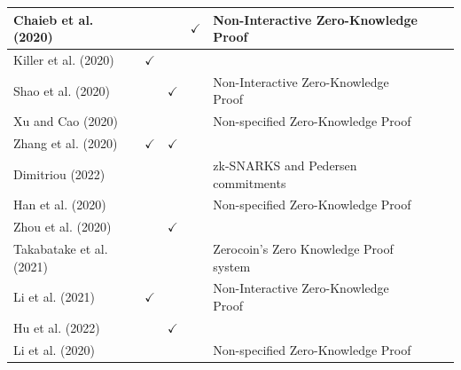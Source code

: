 \documentclass[../access.tex]{subfiles}
\begin{document}
\begin{table}[htbp]
\begin{adjustwidth}{-2cm}{}
\begin{tabular}{m{4.4cm} c >{\centering\arraybackslash}m{1.7cm} c >{\centering\arraybackslash}m{6cm} >{\centering\arraybackslash} m{1.0cm} >{\centering\arraybackslash}m{14.9cm}}
                    \hline
                    \footnotesize{Chaieb et al. (2020) \cite{Chaieb2020}} & {} & {} & $ \checkmark $ & \footnotesize{Non-Interactive Zero-Knowledge Proof} \\
                    \hline
                    \footnotesize{Killer et al. (2020) \cite{Killer2020}} & $ \checkmark $ & {} & {} & {} \\
                    \hline
                    \footnotesize{Shao et al. (2020) \cite{Shao2020}} & {} & $ \checkmark $ & {} & \footnotesize{Non-Interactive Zero-Knowledge Proof} \\
                    \hline
                    \footnotesize{Xu and Cao (2020) \cite{Xu2020}} & {} & {} & {} & \footnotesize{Non-specified Zero-Knowledge Proof} \\
                    \hline
                    \footnotesize{Zhang et al. (2020) \cite{Zhang2020}} & $ \checkmark $ & $ \checkmark $ & {} & {} \\
                    \hline
                    \footnotesize{Dimitriou (2022) \cite{Dimitriou2020}} & {} & {} & {} & \footnotesize{zk-SNARKS and Pedersen commitments} \\
                    \hline
                    \footnotesize{Han et al. (2020) \cite{Han2020}} & {} & {} & {} & \footnotesize{Non-specified Zero-Knowledge Proof} \\
                    \hline
                    \footnotesize{Zhou et al. (2020) \cite{Zhou2020}} & {} & $ \checkmark $ & {} & {} \\
                    \hline
                    \footnotesize{Takabatake et al. (2021) \cite{Takabatake2021}} & {} & {} & {} & \footnotesize{Zerocoin's Zero Knowledge Proof system} \\
                    \hline
                    \footnotesize{Li et al. (2021) \cite{Li2021}} & $ \checkmark $ & {} & {} & \footnotesize{Non-Interactive Zero-Knowledge Proof} \\
                    \hline
                    \footnotesize{Hu et al. (2022) \cite{Hu2022}} & {} & $ \checkmark $ & {} & {} \\
                    \hline
                    \footnotesize{Li et al. (2020) \cite{Li2022}} & {} & {} & {} & \footnotesize{Non-specified Zero-Knowledge Proof} \\
                    \bottomrule
                \end{tabular}
            \end{adjustwidth}
        \label{tbl:table5}
    \end{table}
\end{document}
